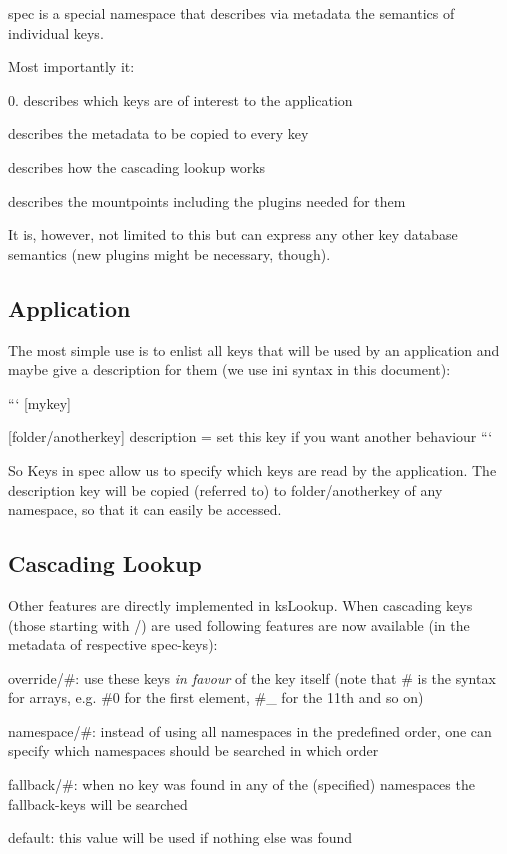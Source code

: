 spec is a special namespace that describes via metadata the semantics of individual keys.

Most importantly it\+:

0. describes which keys are of interest to the application
\begin{DoxyEnumerate}
\item describes the metadata to be copied to every key
\item describes how the cascading lookup works
\item describes the mountpoints including the plugins needed for them
\end{DoxyEnumerate}

It is, however, not limited to this but can express any other key database semantics (new plugins might be necessary, though).

\subsection*{Application}

The most simple use is to enlist all keys that will be used by an application and maybe give a description for them (we use ini syntax in this document)\+:

``` \mbox{[}mykey\mbox{]}

\mbox{[}folder/anotherkey\mbox{]} description = set this key if you want another behaviour ```

So Keys in {\ttfamily spec} allow us to specify which keys are read by the application. The description key will be copied (referred to) to {\ttfamily folder/anotherkey} of any namespace, so that it can easily be accessed.

\subsection*{Cascading Lookup}

Other features are directly implemented in {\ttfamily ks\+Lookup}. When cascading keys (those starting with {\ttfamily /}) are used following features are now available (in the metadata of respective {\ttfamily spec}-\/keys)\+:


\begin{DoxyItemize}
\item {\ttfamily override/\#}\+: use these keys {\itshape in favour} of the key itself (note that {\ttfamily \#} is the syntax for arrays, e.\+g. {\ttfamily \#0} for the first element, {\ttfamily \#\+\_} for the 11th and so on)
\item {\ttfamily namespace/\#}\+: instead of using all namespaces in the predefined order, one can specify which namespaces should be searched in which order
\item {\ttfamily fallback/\#}\+: when no key was found in any of the (specified) namespaces the {\ttfamily fallback}-\/keys will be searched
\item {\ttfamily default}\+: this value will be used if nothing else was found
\end{DoxyItemize}

